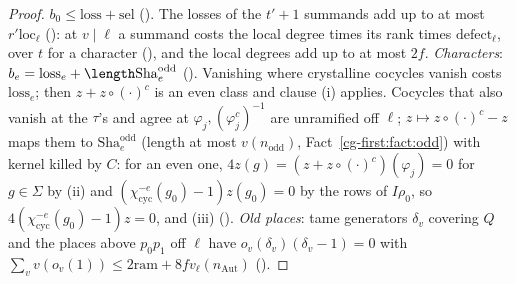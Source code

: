 \begin{proof}
$b_0\le\mathrm{loss}+\mathrm{sel}$ ().
The losses of the $t'+1$ summands add up to at most $r'\mathrm{loc}_\ell$
(): at $v\mid\ell$ a summand costs the
local degree times its rank times $\mathrm{defect}_\ell$, over $t$ for a character
(), and the local degrees add up to at most $2f$.
\emph{Characters}: $b_e=\mathrm{loss}_e+\length\mathrm{Sha}^{\mathrm{odd}}_e$
(). Vanishing where crystalline cocycles vanish costs
$\mathrm{loss}_e$; then $z+z\circ(\cdot)^c$ is an even class and clause (i) applies. Cocycles that also
vanish at the $\tau$'s and agree at $\varphi_j,(\varphi_j^c)^{-1}$ are unramified off $\ell$;
$z\mapsto z\circ(\cdot)^c-z$ maps them to $\mathrm{Sha}^{\mathrm{odd}}_e$ (length at most
$v(n_{\mathrm{odd}})$, Fact~\ref{cg-first:fact:odd}) with kernel killed by $C$: for an even one, $4z(g)=(z+z\circ(\cdot)^c)(\varphi_j)=0$
for $g\in\Sigma$ by (ii) and $(\chi_{\mathrm{cyc}}^{-e}(g_0)-1)z(g_0)=0$ by the rows of $I\rho_0$, so
$4(\chi_{\mathrm{cyc}}^{-e}(g_0)-1)z=0$, and (iii)
().
\emph{Old places}: tame generators $\delta_v$ covering $Q$ and the places above $p_0p_1$ off $\ell$ have
$o_v(\delta_v)(\delta_v-1)=0$ with $\sum_vv(o_v(1))\le2\mathrm{ram}+8fv_\ell(n_{\mathrm{Aut}})$ ().
\end{proof}
